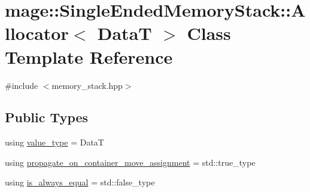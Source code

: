 \hypertarget{classmage_1_1_single_ended_memory_stack_1_1_allocator}{}\section{mage\+:\+:Single\+Ended\+Memory\+Stack\+:\+:Allocator$<$ DataT $>$ Class Template Reference}
\label{classmage_1_1_single_ended_memory_stack_1_1_allocator}


{\ttfamily \#include $<$memory\+\_\+stack.\+hpp$>$}

\subsection*{Public Types}
\begin{DoxyCompactItemize}
\item 
using \hyperlink{classmage_1_1_single_ended_memory_stack_1_1_allocator_a4d5b98a534ad4e6d6f2d8eb1280398ab}{value\+\_\+type} = DataT
\item 
using \hyperlink{classmage_1_1_single_ended_memory_stack_1_1_allocator_a408c0a4b29dc60e9564245c6a0a6fd4c}{propagate\+\_\+on\+\_\+container\+\_\+move\+\_\+assignment} = std\+::true\+\_\+type
\item 
using \hyperlink{classmage_1_1_single_ended_memory_stack_1_1_allocator_a64d005be12e9d1749c0e6eeea5107a98}{is\+\_\+always\+\_\+equal} = std\+::false\+\_\+type
\end{DoxyCompactItemize}
